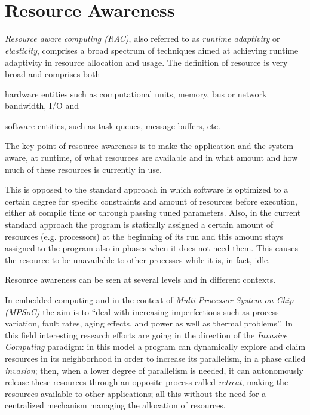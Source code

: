 
~\\~
\section{Resource Awareness} \label{sec:resourceAwareness}

\emph{Resource aware computing (RAC)}, also referred to as \emph{runtime adaptivity} or \emph{elasticity}, comprises a broad spectrum of techniques aimed at achieving runtime adaptivity in resource allocation and usage. The definition of resource is very broad and comprises both 
\begin{enumerate*}[label={(\roman*)}]
	\item hardware entities such as computational units, memory, bus or network bandwidth, I/O and
	\item software entities, such as task queues, message buffers, etc.
\end{enumerate*}

The key point of resource awareness is to make the application and the system aware, at runtime, of what resources are available and in what amount and how much of these resources is currently in use.

This is opposed to the standard approach in which software is optimized to a certain degree for specific constraints and amount of resources before execution, either at compile time or through passing tuned parameters.
Also, in the current standard approach the program is statically assigned a certain amount of resources (e.g. processors) at the beginning of its run and this amount stays assigned to the program also in phases when it does not need them. This causes the resource to be unavailable to other processes while it is, in fact, idle.

Resource awareness can be seen at several levels and in different contexts.

In embedded computing and in the context of \emph{Multi-Processor System on Chip (MPSoC)} the aim is to ``deal with increasing imperfections such as process variation, fault rates, aging effects, and power as well as thermal problems''\cite{hannig2011resource}. In this field interesting research efforts are going in the direction of the \emph{Invasive Computing}\cite{teich2011invasive} paradigm: in this model a program can dynamically explore and claim resources in its neighborhood in order to increase its parallelism, in a phase called \emph{invasion}; then, when a lower degree of parallelism is needed, it can autonomously release these resources through an opposite process called \emph{retreat}, making the resources available to other applications; all this without the need for a centralized mechanism managing the allocation of resources.

